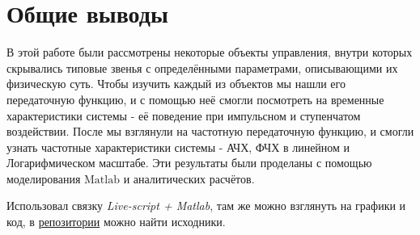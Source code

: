 \chapter{Общие выводы}
\label{ch:chap6}

В этой работе были рассмотрены некоторые объекты управления, внутри которых скрывались типовые звенья с определёнными параметрами, описывающими их физическую суть. 
Чтобы изучить каждый из объектов мы нашли его передаточную функцию, и с помощью неё смогли посмотреть на временные характеристики системы - её поведение при импульсном и ступенчатом воздействии. 
После мы взглянули на частотную передаточную функцию, и смогли узнать частотные характеристики системы - АЧХ, ФЧХ в линейном и Логарифмическом масштабе. Эти результаты были проделаны с помощью моделирования $\textrm{Matlab}$ и аналитических расчётов.

Использовал связку \textit{Live-script + Matlab}, там же можно взглянуть на графики и код, в \href{https://github.com/GreedlyCore/control_theory_course}{репозитории} можно найти исходники. 
\endinput